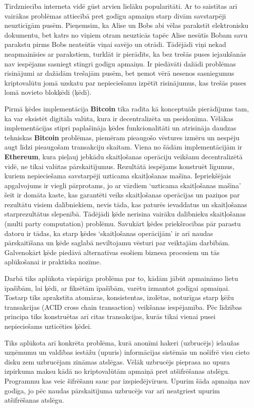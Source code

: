 Tirdzniecība interneta vidē gūst arvien lielāku popularitāti. 
Ar to saistītas arī vairākas problēmas attiecībā pret godīgu apmaiņu starp divām savstarpēji neuzticīgām pusēm. 
Pieņemsim, ka Alise un Bobs abi vēlas parakstīt elektronisku dokumentu, bet katrs no viņiem otram neuzticās tapēc Alise nesūtīs Bobam savu parakstu pirms Bobs neatsūtīs viņai savējo un otrādi. 
Tādējādi viņi nekad neapmainīsies ar parakstiem, turklāt ir pierādīts, ka bez trešās puses iejaukšanās nav iespējams sasniegt stingri godīgu apmaiņu.\cite{pagnia99}
Ir piedāvāti dažādi problēmas risinājumi ar dažādām trešajām pusēm, bet ņemot vērā nesenos sasniegumus kriptovalūtu jomā uzskatu par nepieciešamu izpētīt risinājumus, kas trešās puses lomā novieto blokķēdi (ķēdi). 

Pirmā ķēdes implementācija \textbf{Bitcoin} tika radīta kā konceptuāls pierādījums tam, ka var eksistēt digitāla valūta, kura ir decentralizēta un pseidonīma. 
Vēlākas implementācijas stipri paplašināja ķēdes funkcionalitāti un atrisināja daudzas tehniskas \textbf{Bitcoin} problēmas, piemēram pieaugošo vēstures izmēru un nespēju augt līdzi pieaugošam transakciju skaitam. 
Viena no šādām implementācijām ir \textbf{Ethereum}, kura pieļauj jebkādu skaitļošanas operāciju veikšanu decentralizētā vidē, ne tikai valūtas pārskaitījumus. 
Rezultātā iespējams konstruēt līgumus, kuriem nepieciešama savstarpēji uzticama skaitļošanas mašīna.
Iepriekšējais apgalvojums ir viegli pārprotams, jo ar vārdiem `uzticama skaitļošanas mašīna' šeit ir domāta kaste, kas garantēti veiks skaitļošanas operācijas un paziņos par rezultātu visiem dalībniekiem, nevis tāda, kas paturēs ievaddatus un skaitļošanas starprezultātus slepenībā.
Tādējādi ķēde nerisina vairāku dalībnieku skaitļošanas (multi party computation) problēmu.
Savukārt ķēdes priekšrocības pār parastu datoru ir tādas, ka starp ķēdes `skaitļošanas operācijām' ir arī naudas pārskaitīšana un ķēde saglabā neviltojamu vēsturi par veiktajām darbībām.
Galvenokārt ķēde piedāvā alternatīvas esošiem biznesa procesiem un tās aplūkošanai ir praktiska nozīme.

Darbā tiks aplūkota vispārīga problēma par to, kādām jābūt apmaināmo lietu īpašībām, lai ķēdi, ar fiksētām īpašībām, varētu izmantot godīgai apmaiņai. Tostarp tiks aprakstīta atomāras, konsistentas, izolētas, noturīgas starp ķēžu transakcijas (ACID cross chain transaction) veikšanas iespējamība.\cite{back14,nolan13} Pēc līdzības principa tiks konstruētas arī citas transakcijas, kurās tikai vienai pusei nepieciešams uzticēties ķēdei.

Tiks aplūkota arī konkrēta problēma, kurā anonīmi hakeri (uzbrucējs) ielaužas uzņēmumu un valdības iestāžu (upuris) informācijas sistēmās un nošifrē visu cieto disku zem uzbrucējam zināmas atslēgas. 
Vēlāk uzbrucējs pieprasa no upura izpirkuma maksu kādā no kriptovalūtām apmaiņā pret atšifrēšanas atslēgu. Programmu kas veic šifrēšanu sauc par izspiedējvīrusu.
Upurim šāda apmaiņa nav godīga, jo pēc naudas pārskaitījuma uzbrucējs var arī neatgriest upurim atšifrēšanas atslēgu. %
